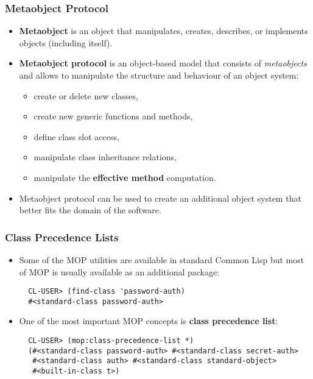 \documentclass{beamer}
\begin{document}
\begin{frame}[fragile]
  \frametitle{Metaobject Protocol}
  \begin{itemize}
  \item \textbf{Metaobject} is an object that manipulates, creates, describes,
    or implements objects (including itself).
  \item \textbf{Metaobject protocol} is an object-based model that consists of
    \textit{metaobjects} and allows to manipulate the structure and behaviour of
    an object system:
    \begin{itemize}
    \item create or delete new classes,
    \item create new generic functions and methods,
    \item define class slot access,
    \item manipulate class inheritance relations,
    \item manipulate the \textbf{effective method} computation.
    \end{itemize}
  \item Metaobject protocol can be used to create an additional object system
    that better fits the domain of the software.
  \end{itemize}
\end{frame}

\begin{frame}[fragile]
  \frametitle{Class Precedence Lists}
  \begin{itemize}
  \item Some of the MOP utilities are available in standard Common Lisp but most
    of MOP is usually available as an additional package:
\begin{verbatim}
  CL-USER> (find-class 'password-auth)
  #<standard-class password-auth>
\end{verbatim}
  \item One of the most important MOP concepts is \textbf{class precedence
      list}:
\begin{verbatim}
  CL-USER> (mop:class-precedence-list *)
  (#<standard-class password-auth> #<standard-class secret-auth>
   #<standard-class auth> #<standard-class standard-object>
   #<built-in-class t>)
\end{verbatim}
  \end{itemize}
\end{frame}
\end{document}
